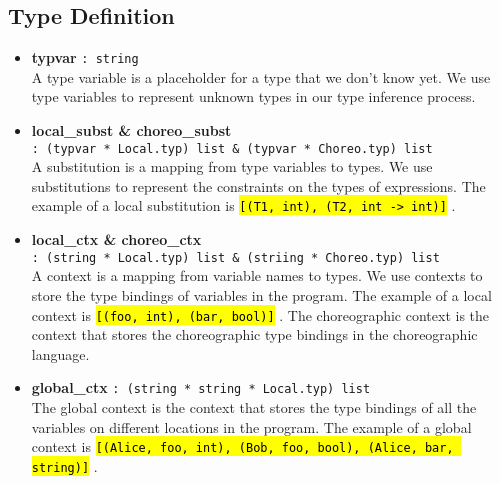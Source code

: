 \documentclass{article}
\newcommand{\highlighttexttt}[2][black]{ %
  \sethlcolor{cyan!10} %
  \texttt{\textcolor{#1}{\hl{#2}}}
}
\begin{document}
\subsection{Type Definition}
    \begin{itemize}
        \item \textbf{typvar} \texttt{: string}\\
              A type variable is a placeholder for a type that we don't know yet. We use type variables to represent unknown types in our type inference process.
        \item \textbf{local\_subst \& choreo\_subst} \\\texttt{: (typvar * Local.typ) list \& (typvar * Choreo.typ) list}\\
              A substitution is a mapping from type variables to types. We use substitutions to represent the constraints on the types of expressions.
              The example of a local substitution is \highlighttexttt{[(T1, int), (T2, int -> int)]}.
        \item \textbf{local\_ctx \& choreo\_ctx} \\\texttt{: (string * Local.typ) list \& (striing * Choreo.typ) list}\\
              A context is a mapping from variable names to types. We use contexts to store the type bindings of variables in the program.
              The example of a local context is \highlighttexttt{[(foo, int), (bar, bool)]}.
              The choreographic context is the context that stores the choreographic type bindings in the choreographic language.
        \item \textbf{global\_ctx} \texttt{: (string * string * Local.typ) list}\\
              The global context is the context that stores the type bindings of all the variables on different locations in the program.
              The example of a global context is \highlighttexttt{[(Alice, foo, int), (Bob, foo, bool), (Alice, bar, string)]}.
    \end{itemize}
\end{document}

